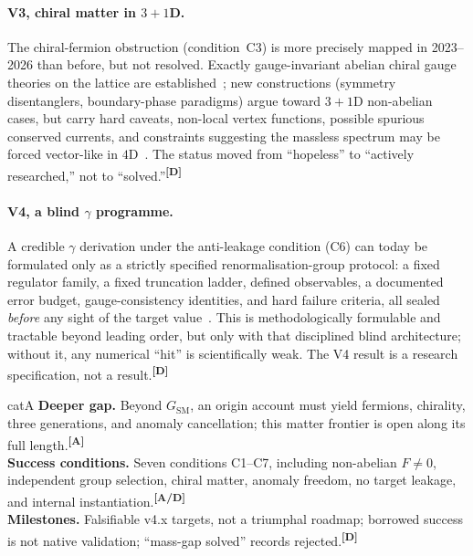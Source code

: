 \documentclass[12pt,a4paper,twoside]{article}
\theoremstyle{plain}
\theoremstyle{definition}
\theoremstyle{remark}
\newcommand{\catmark}[1]{\textsuperscript{\textsf{\textbf{[#1]}}}}
\begin{document}
\paragraph{V3, chiral matter in $3+1$D.}
The chiral-fermion obstruction (condition~C3) is more precisely mapped in 2023--2026 than before, but not resolved. Exactly gauge-invariant abelian chiral gauge theories on the lattice are established~\cite{luscher1999}; new constructions (symmetry disentanglers, boundary-phase paradigms) argue toward $3+1$D non-abelian cases, but carry hard caveats, non-local vertex functions, possible spurious conserved currents, and constraints suggesting the massless spectrum may be forced vector-like in $4$D~\cite{golterman2023}. The status moved from ``hopeless'' to ``actively researched,'' not to ``solved.''\catmark{D}

\paragraph{V4, a blind $\gamma$ programme.}
A credible $\gamma$ derivation under the anti-leakage condition (C6) can today be formulated only as a strictly specified renormalisation-group protocol: a fixed regulator family, a fixed truncation ladder, defined observables, a documented error budget, gauge-consistency identities, and hard failure criteria, all sealed \emph{before} any sight of the target value~\cite{dupuis2021,schnoerr2013}. This is methodologically formulable and tractable beyond leading order, but only with that disciplined blind architecture; without it, any numerical ``hit'' is scientifically weak. The V4 result is a research specification, not a result.\catmark{D}

\begin{evidencebox}{catA}
\textbf{Deeper gap.} Beyond $G_{\mathrm{SM}}$, an origin account must yield fermions, chirality, three generations, and anomaly cancellation; this matter
frontier is open along its full length.\catmark{A}\\[0.3em]
\textbf{Success conditions.} Seven conditions C1--C7, including non-abelian $F\neq 0$, independent group selection, chiral matter, anomaly freedom, no target
leakage, and internal instantiation.\catmark{A/D}\\[0.3em]
\textbf{Milestones.} Falsifiable v4.x targets, not a triumphal roadmap; borrowed success is not native validation; ``mass-gap solved'' records rejected.\catmark{D}
\end{evidencebox}
\end{document}
